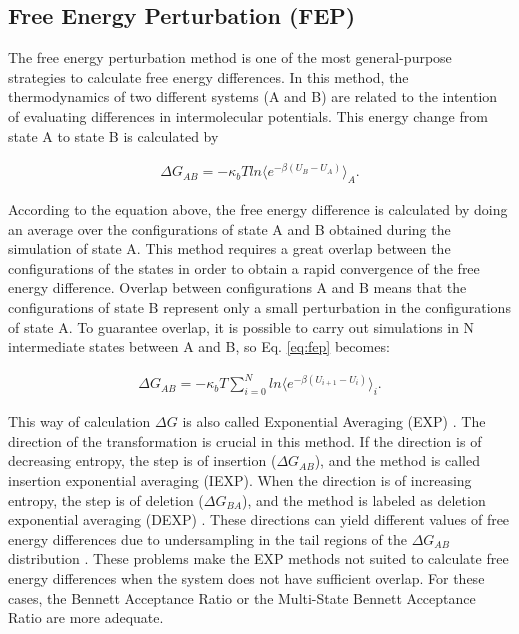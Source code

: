 \subsection{Free Energy Perturbation (FEP)}
The free energy perturbation method \cite{zwanzig1954} is one of the most general-purpose strategies to calculate free energy differences. In this method, the thermodynamics of two different systems (A and B) are related to the intention of evaluating differences in intermolecular potentials. This energy change from state A to state B is calculated by  

\begin{equation}
\label{eq:fep}
\begin{aligned}
\Delta G_{AB} = -\kappa_{b}T ln \langle{e^{-\beta (U_{B}-U_{A})}}\rangle_{A} .
\end{aligned}
\end{equation}

According to the equation above, the free energy difference is calculated by doing an average over the configurations of state A and B obtained during the simulation of state A. This method requires a great overlap between the configurations of the states in order to obtain a rapid convergence of the free energy difference. Overlap between configurations A and B means that the configurations of state B represent only a small perturbation in the configurations of state A. To guarantee overlap, it is possible to carry out simulations in N intermediate states between A and B, so Eq. \eqref{eq:fep} becomes:

\begin{equation}
\label{eq:fepint}
\begin{aligned}
\Delta G_{AB} = -\kappa_{b}T  \sum_{i=0}^{N}
ln \langle {e^{-\beta (U_{i+1}-U_{i})}} \rangle_{i} .
\end{aligned}
\end{equation}

This way of calculation $\Delta G$ is also called Exponential Averaging (EXP) \cite{zwanzig1955,bareva}. The direction of the transformation is crucial in this method. If the direction is of decreasing entropy, the step is of insertion ($\Delta G_{AB}$), and the method is called insertion exponential averaging (IEXP). When the direction is of increasing entropy, the step is of deletion ($\Delta G_{BA}$), and the method is labeled as deletion exponential averaging (DEXP) \cite{bareva}. These directions can yield different values of free energy differences due to undersampling in the tail regions of the $\Delta G_{AB}$ distribution \cite{klimovich,pohorille2010}. These problems make the EXP methods not suited to calculate free energy differences when the system does not have sufficient overlap. For these cases, the Bennett Acceptance Ratio or the Multi-State Bennett Acceptance Ratio are more adequate.   

